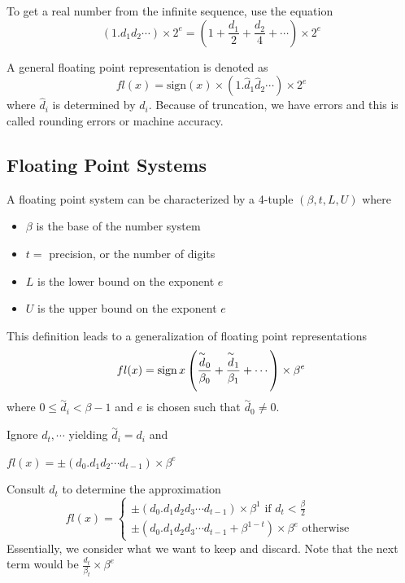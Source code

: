 \documentclass[12pt]{scrartcl}
\begin{document}
\begin{note}
  To get a real number from the infinite sequence, use the equation 
  \[(1.d_1d_2\cdots) \times 2^e = (1 + \frac{d_1}{2} + \frac{d_2}{4} + \cdots) \times 2^e\]
\end{note}

\begin{note}
  A general floating point representation is denoted as 
  \[fl(x) = \text{sign}(x) \times (1.\hat{d}_1 \hat{d}_2 \cdots) \times 2^e\]
  where $\hat{d}_i$ is determined by $d_i$. Because of truncation, we have errors and this is called 
  rounding errors or machine accuracy.
\end{note}

\subsection{Floating Point Systems}

\begin{definition}
  A floating point system can be characterized by a 4-tuple $(\beta, t, L, U)$ where 
  \begin{itemize}
    \item $\beta$ is the base of the number system 
    \item $t = $ precision, or the number of digits
    \item $L$ is the lower bound on the exponent $e$
    \item $U$ is the upper bound on the exponent $e$ 
  \end{itemize}
  This definition leads to a generalization of floating point representations 
  \[fl(x) = \operatorname{sign}{x} \left( \frac{\overset{\sim}{d}_0}{\beta_0} + \frac{\overset{\sim}{d}_1}{\beta_1} + \cdots\right) \times \beta^e\]
  where $0 \leq \overset{\sim}{d}_i < \beta - 1$ and $e$ is chosen such that $\overset{\sim}{d}_0 \neq 0$.
\end{definition}

\begin{definition}[Chopping]
  Ignore $d_t, \cdots$ yielding $\overset{\sim}{d}_i = d_i$ and 
  
  $fl(x) = \pm (d_0.d_1d_2\cdots d_{t-1}) \times \beta^e$
\end{definition}

\begin{definition}[Rounding]
  Consult $d_t$ to determine the approximation 
  \[fl(x) = \begin{cases}
    \pm (d_0.d_1d_2d_3\cdots d_{t-1}) \times \beta^1 \text{ if } d_t < \frac{\beta}{2}\\
    \pm (d_0.d_1d_2d_3\cdots d_{t-1} + \beta^{1-t}) \times \beta^e \text{ otherwise }
  \end{cases}\]
  Essentially, we consider what we want to keep and discard. Note that the next term would be $\frac{d_t}{\beta_t} \times \beta^e$
\end{definition}
\end{document}
